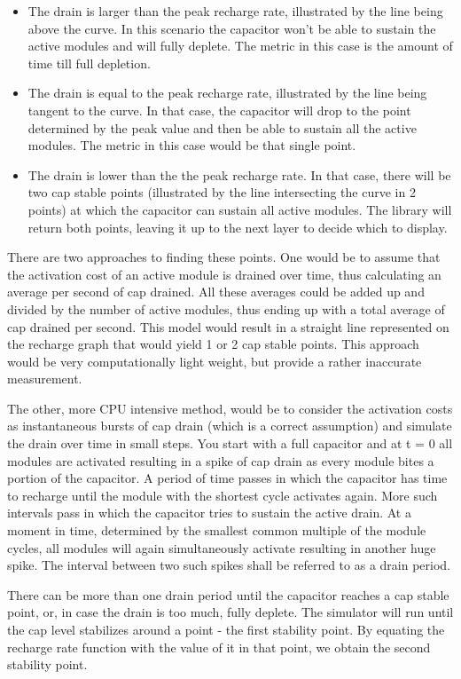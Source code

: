 \begin{itemize}
\item The drain is larger than the peak recharge rate, illustrated by the line being above the curve. In this scenario the capacitor won’t be able to sustain the active modules and will fully deplete. The metric in this case is the amount of time till full depletion.
\item The drain is equal to the peak recharge rate, illustrated by the line being tangent to the curve. In that case, the capacitor will drop to the point determined by the peak value and then be able to sustain all the active modules. The metric in this case would be that single point.
\item The drain is lower than the the peak recharge rate. In that case, there will be two cap stable points (illustrated by the line intersecting the curve in 2 points) at which the capacitor can sustain all active modules. The library will return both points, leaving it up to the next layer to decide which to display.
\end{itemize}

There are two approaches to finding these points. One would be to assume that the activation cost of an active module is drained over time, thus calculating an average per second of cap drained. All these averages could be added up and divided by the number of active modules, thus ending up with a total average of cap drained per second. This model would result in a straight line represented on the recharge graph that would yield 1 or 2 cap stable points. This approach would be very computationally light weight, but provide a rather inaccurate measurement.

The other, more CPU intensive method, would be to consider the activation costs as instantaneous bursts of cap drain (which is a correct assumption) and simulate the drain over time in small steps. You start with a full capacitor and at t = 0 all modules are activated resulting in a spike of cap drain as every module bites a portion of the capacitor. A period of time passes in which the capacitor has time to recharge until the module with the shortest cycle activates again. More such intervals pass in which the capacitor tries to sustain the active drain. At a moment in time, determined by the smallest common multiple of the module cycles, all modules will again simultaneously activate resulting in another huge spike. The interval between two such spikes shall be referred to as a drain period.

There can be more than one drain period until the capacitor reaches a cap stable point, or, in case the drain is too much, fully deplete. The simulator will run until the cap level stabilizes around a point - the first stability point. By equating the recharge rate function with the value of it in that point, we obtain the second stability point.

